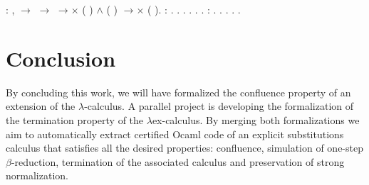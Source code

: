 \documentclass[conference]{IEEEtran}
\begin{document}
\begin{coqdoccode}
\coqdocnoindent
{} : \coqdockw{\ensuremath{\forall}}  ,  \ensuremath{\rightarrow}  \ensuremath{\rightarrow}  \ensuremath{\rightarrow}\ensuremath{\times} ( ) \ensuremath{\land} ( ) \ensuremath{\rightarrow}\ensuremath{\times} ( ).\coqdoceol
\coqdocemptyline
\coqdocnoindent
{} :  .\coqdoceol
\coqdocnoindent
{}.\coqdoceol
\coqdocindent{1.00em}
 .\coqdoceol
\coqdocindent{1.00em}
\coqdoctac{\ensuremath{\exists}} .\coqdoceol
\coqdocindent{1.00em}
 .\coqdoceol
\coqdocnoindent
{}.\coqdoceol
\coqdocemptyline
\coqdocnoindent
{} :  .\coqdoceol
\coqdocnoindent
{}.\coqdoceol
\coqdocindent{1.00em}
 .\coqdoceol
\coqdocindent{1.00em}
 .\coqdoceol
\coqdocnoindent
{}.\coqdoceol
\end{coqdoccode}

\section{Conclusion}

By concluding this work, we will have formalized the confluence
property of an extension of the $\lambda$-calculus. A parallel project
is developing the formalization of the termination property of the
$\lambda$ex-calculus. By merging both formalizations we aim to
automatically extract certified Ocaml code of an explicit
substitutions calculus that satisfies all the desired properties:
confluence, simulation of one-step $\beta$-reduction, termination of
the associated calculus and preservation of strong normalization.



\end{document}
